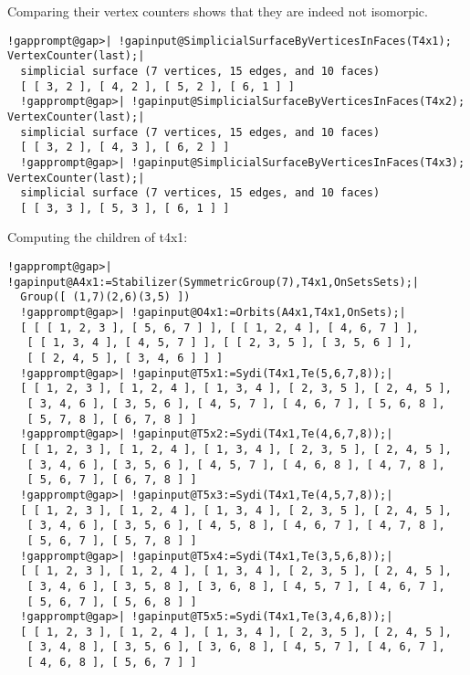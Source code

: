 \documentclass[a4paper,11pt]{report}
\begin{document}
{{{ Comparing their vertex counters shows that they are indeed not isomorpic. 

 
\begin{Verbatim}[commandchars=!@|,fontsize=\small,frame=single,label=Example]
  !gapprompt@gap>| !gapinput@SimplicialSurfaceByVerticesInFaces(T4x1); VertexCounter(last);|
  simplicial surface (7 vertices, 15 edges, and 10 faces)
  [ [ 3, 2 ], [ 4, 2 ], [ 5, 2 ], [ 6, 1 ] ]
  !gapprompt@gap>| !gapinput@SimplicialSurfaceByVerticesInFaces(T4x2); VertexCounter(last);|
  simplicial surface (7 vertices, 15 edges, and 10 faces)
  [ [ 3, 2 ], [ 4, 3 ], [ 6, 2 ] ]
  !gapprompt@gap>| !gapinput@SimplicialSurfaceByVerticesInFaces(T4x3); VertexCounter(last);|
  simplicial surface (7 vertices, 15 edges, and 10 faces)
  [ [ 3, 3 ], [ 5, 3 ], [ 6, 1 ] ]
\end{Verbatim}
 

 Computing the children of t4x1: 

 
\begin{Verbatim}[commandchars=!@|,fontsize=\small,frame=single,label=Example]
  !gapprompt@gap>| !gapinput@A4x1:=Stabilizer(SymmetricGroup(7),T4x1,OnSetsSets);|
  Group([ (1,7)(2,6)(3,5) ])
  !gapprompt@gap>| !gapinput@O4x1:=Orbits(A4x1,T4x1,OnSets);|
  [ [ [ 1, 2, 3 ], [ 5, 6, 7 ] ], [ [ 1, 2, 4 ], [ 4, 6, 7 ] ], 
   [ [ 1, 3, 4 ], [ 4, 5, 7 ] ], [ [ 2, 3, 5 ], [ 3, 5, 6 ] ], 
   [ [ 2, 4, 5 ], [ 3, 4, 6 ] ] ]
  !gapprompt@gap>| !gapinput@T5x1:=Sydi(T4x1,Te(5,6,7,8));|
  [ [ 1, 2, 3 ], [ 1, 2, 4 ], [ 1, 3, 4 ], [ 2, 3, 5 ], [ 2, 4, 5 ], 
   [ 3, 4, 6 ], [ 3, 5, 6 ], [ 4, 5, 7 ], [ 4, 6, 7 ], [ 5, 6, 8 ], 
   [ 5, 7, 8 ], [ 6, 7, 8 ] ]
  !gapprompt@gap>| !gapinput@T5x2:=Sydi(T4x1,Te(4,6,7,8));|
  [ [ 1, 2, 3 ], [ 1, 2, 4 ], [ 1, 3, 4 ], [ 2, 3, 5 ], [ 2, 4, 5 ], 
   [ 3, 4, 6 ], [ 3, 5, 6 ], [ 4, 5, 7 ], [ 4, 6, 8 ], [ 4, 7, 8 ], 
   [ 5, 6, 7 ], [ 6, 7, 8 ] ]
  !gapprompt@gap>| !gapinput@T5x3:=Sydi(T4x1,Te(4,5,7,8));|
  [ [ 1, 2, 3 ], [ 1, 2, 4 ], [ 1, 3, 4 ], [ 2, 3, 5 ], [ 2, 4, 5 ], 
   [ 3, 4, 6 ], [ 3, 5, 6 ], [ 4, 5, 8 ], [ 4, 6, 7 ], [ 4, 7, 8 ], 
   [ 5, 6, 7 ], [ 5, 7, 8 ] ]
  !gapprompt@gap>| !gapinput@T5x4:=Sydi(T4x1,Te(3,5,6,8));|
  [ [ 1, 2, 3 ], [ 1, 2, 4 ], [ 1, 3, 4 ], [ 2, 3, 5 ], [ 2, 4, 5 ], 
   [ 3, 4, 6 ], [ 3, 5, 8 ], [ 3, 6, 8 ], [ 4, 5, 7 ], [ 4, 6, 7 ], 
   [ 5, 6, 7 ], [ 5, 6, 8 ] ]
  !gapprompt@gap>| !gapinput@T5x5:=Sydi(T4x1,Te(3,4,6,8));|
  [ [ 1, 2, 3 ], [ 1, 2, 4 ], [ 1, 3, 4 ], [ 2, 3, 5 ], [ 2, 4, 5 ], 
   [ 3, 4, 8 ], [ 3, 5, 6 ], [ 3, 6, 8 ], [ 4, 5, 7 ], [ 4, 6, 7 ], 
   [ 4, 6, 8 ], [ 5, 6, 7 ] ]
\end{Verbatim}
 

}}}
\end{document}
